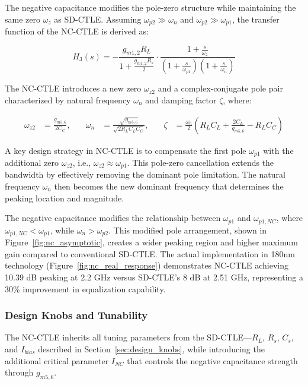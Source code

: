 The negative capacitance modifies the pole-zero structure while maintaining the same zero $\omega_z$ as SD-CTLE. Assuming $\omega_{p2} \gg \omega_n$ and $\omega_{p2} \gg \omega_{p1}$, the transfer function of the NC-CTLE is derived as:

\[
H_3(s) = -\frac{g_{m1,2}R_L}{1 + \frac{g_{m1,2}R_s}{2}} \cdot \frac{1 + \frac{s}{\omega_z}}{(1 + \frac{s}{\omega_{p1}})(1 + \frac{s}{\omega_n})}
\]

The NC-CTLE introduces a new zero $\omega_{z2}$ and a complex-conjugate pole pair characterized by natural frequency $\omega_n$ and damping factor $\zeta$, where:

\[
\begin{aligned}
\omega_{z2} &= \frac{g_{m5,6}}{2C_C}, &\quad
\omega_n &= \frac{\sqrt{g_{m5,6}}}{\sqrt{2R_LC_LC_C}}, &\quad
\zeta &= \frac{\omega_n}{2} \left( R_LC_L + \frac{2C_L}{g_{m5,6}} - R_LC_C \right)
\end{aligned}
\]

A key design strategy in NC-CTLE is to compensate the first pole $\omega_{p1}$ with the additional zero $\omega_{z2}$, i.e., $\omega_{z2} \approx \omega_{p1}$. This pole-zero cancellation extends the bandwidth by effectively removing the dominant pole limitation. The natural frequency $\omega_n$ then becomes the new dominant frequency that determines the peaking location and magnitude.

The negative capacitance modifies the relationship between $\omega_{p1}$ and $\omega_{p1,NC}$, where $\omega_{p1,NC} < \omega_{p1}$, while $\omega_n > \omega_{p2}$. This modified pole arrangement, shown in Figure~\ref{fig:nc_asymptotic}, creates a wider peaking region and higher maximum gain compared to conventional SD-CTLE. The actual implementation in 180nm technology (Figure~\ref{fig:nc_real_response}) demonstrates NC-CTLE achieving 10.39 dB peaking at 2.2 GHz versus SD-CTLE's 8 dB at 2.51 GHz, representing a 30\% improvement in equalization capability.

\subsubsection*{Design Knobs and Tunability}

The NC-CTLE inherits all tuning parameters from the SD-CTLE—$R_L$, $R_s$, $C_s$, and $I_{bias}$ described in Section~\ref{sec:design_knobs}, while introducing the additional critical parameter $I_{NC}$ that controls the negative capacitance strength through $g_{m5,6}$.

